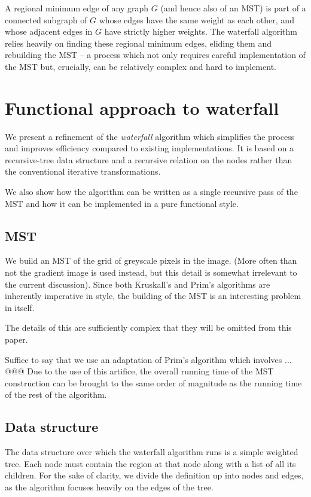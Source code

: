 \documentclass{jfp}
\begin{document}
A regional minimum edge of any graph $G$ (and hence also of an MST) is
part of a connected subgraph of $G$ whose edges have the same weight
as each other, and whose adjacent edges in $G$ have strictly higher
weights. The waterfall algorithm relies heavily on finding these
regional minimum edges, eliding them and rebuilding the MST -- a
process which not only requires careful implementation of the MST but,
crucially, can be relatively complex and hard to implement.


\section{Functional approach to waterfall}


We present a refinement of the {\em waterfall\/} algorithm which
simplifies the process and improves efficiency compared to existing
implementations. It is based on a recursive-tree data structure and a
recursive relation on the nodes rather than the conventional iterative
transformations.

We also show how the algorithm can be written as a single recursive
pass of the MST and how it can be implemented in a pure functional
style.

\subsection{MST}

We build an MST of the grid of greyscale pixels in the image. (More
often than not the gradient image is used instead, but this detail is
somewhat irrelevant to the current discussion). Since both Kruskall's
and Prim's algorithms are inherently imperative in style, the building
of the MST is an interesting problem in itself.

The details of this are sufficiently complex that they will be omitted
from this paper.

Suffice to say that we use an adaptation of Prim's algorithm which
involves ... @@@ Due to the use of this artifice, the overall running
time of the MST construction can be brought to the same order of
magnitude as the running time of the rest of the algorithm.


\subsection{Data structure}

The data structure over which the waterfall algorithm runs is a simple
weighted tree. Each node must contain the region at that node along
with a list of all its children.  For the sake of clarity, we divide
the definition up into nodes and edges, as the algorithm focuses
heavily on the edges of the tree.
\end{document}
